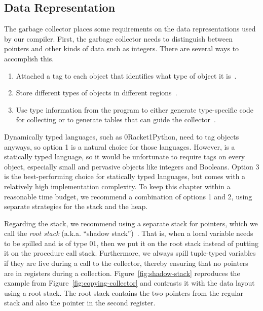 \documentclass[7x10,nocrop]{TimesAPriori_MIT}%
\def\racketEd{0}
\def\pythonEd{1}
\def\edition{0}
\newcommand{\racket}[1]{{\if\edition\racketEd{#1}\fi}}
\newcommand{\python}[1]{{\if\edition\pythonEd #1\fi}}
\begin{document}
\subsection{Data Representation}
\label{sec:data-rep-gc}

The garbage collector places some requirements on the data
representations used by our compiler. First, the garbage collector
needs to distinguish between pointers and other kinds of data such as
integers. There are several ways to accomplish this.
\begin{enumerate}
\item Attached a tag to each object that identifies what type of
  object it is~\citep{McCarthy:1960dz}.
\item Store different types of objects in different
  regions~\citep{Steele:1977ab}.
\item Use type information from the program to either generate
  type-specific code for collecting or to generate tables that can
  guide the
  collector~\citep{Appel:1989aa,Goldberg:1991aa,Diwan:1992aa}.
\end{enumerate}
Dynamically typed languages, such as \racket{Racket}\python{Python},
need to tag objects anyways, so option 1 is a natural choice for those
languages.  However, \LangVec{} is a statically typed language, so it
would be unfortunate to require tags on every object, especially small
and pervasive objects like integers and Booleans.  Option 3 is the
best-performing choice for statically typed languages, but comes with
a relatively high implementation complexity. To keep this chapter
within a reasonable time budget, we recommend a combination of options
1 and 2, using separate strategies for the stack and the heap.

Regarding the stack, we recommend using a separate stack for pointers,
which we call the \emph{root stack}
(a.k.a. ``shadow
stack'')~\citep{Siebert:2001aa,Henderson:2002aa,Baker:2009aa}. That
is, when a local variable needs to be spilled and is of type
\racket{}\python{}, then we put it on the
root stack instead of putting it on the procedure call
stack. Furthermore, we always spill tuple-typed variables if they are
live during a call to the collector, thereby ensuring that no pointers
are in registers during a collection. Figure~\ref{fig:shadow-stack}
reproduces the example from Figure~\ref{fig:copying-collector} and
contrasts it with the data layout using a root stack. The root stack
contains the two pointers from the regular stack and also the pointer
in the second register.
\end{document}
